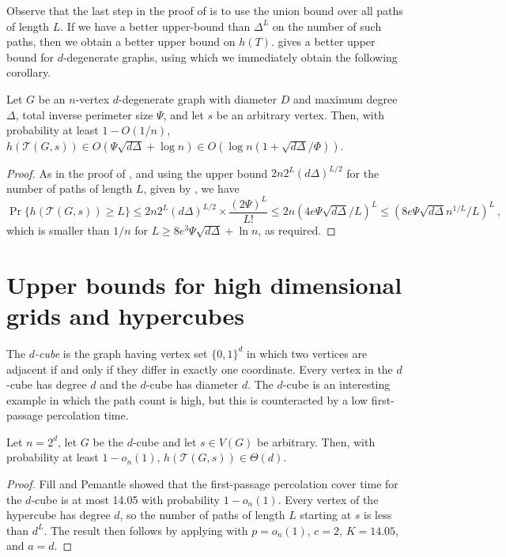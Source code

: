 \documentclass{patmorin}
\newcommand{\tcal}{\mathcal{T}}
\begin{document}
Observe that the last step in the proof of
 is to use the union bound over all
paths of length $L$.  If we have a better upper-bound than $\Delta^L$ on
the number of such paths, then we obtain a better upper bound on $h(T)$.
 gives a better upper bound for $d$-degenerate graphs, using which we immediately obtain the following corollary.

\begin{cor}
  Let $G$ be an $n$-vertex $d$-degenerate graph with diameter $D$
  and maximum degree $\Delta$, total inverse perimeter size $\Psi$,
  and let $s$ be an arbitrary vertex.
  Then, with probability at least $1-O(1/n)$,
  $h(\tcal(G,s))\in O(\Psi\sqrt{d\Delta}+\log n)
  \in O(\log n (1+ \sqrt{d\Delta}/\Phi))$.
\end{cor}

\begin{proof}
As in the proof of ,
and using the upper bound 
$2n2^{L}(d\Delta)^{L/2}$ for the number of paths of length $L$, given by , we have
   \[
        \Pr\{h(\tcal(G,s)) \ge L\} \le  2n2^{L}(d\Delta)^{L/2}\times
        \frac{(2\Psi)^L}{L!} \leq
        2n\left( 4e\Psi\sqrt{d\Delta}/L \right)^L
        \leq
        \left( 8e\Psi\sqrt{d\Delta}n^{1/L}/L \right)^L\:,
    \]
    which is smaller than $1/n$ for $L\geq 8e^3 \Psi \sqrt{d\Delta}+\ln n$, as required.
\end{proof}

\section{Upper bounds for high dimensional grids and hypercubes}
The \emph{$d$-cube} is the graph having vertex set $\{0,1\}^d$ in
which two vertices are adjacent if and only if they differ in exactly
one coordinate.  Every vertex in the $d$-cube has degree $d$ and the
$d$-cube has diameter $d$.  The $d$-cube is an interesting example
in which the path count is high, but this is counteracted by a low
first-passage percolation time.

\begin{thm}
  Let $n=2^d$, let $G$ be the $d$-cube and let $s\in V(G)$ be arbitrary. Then,
  with probability at least $1-o_n(1)$, $h(\tcal(G,s))\in \Theta(d)$.
\end{thm}

\begin{proof}
  Fill and Pemantle \cite{fill.pemantle:percolation} showed that the
  first-passage percolation cover time for the $d$-cube is at most 14.05
  with probability $1-o_n(1)$.  Every vertex of the hypercube has degree
  $d$, so the number of paths of length $L$ starting at $s$ is less
  than $d^L$.  The result then follows by applying 
  with $p=o_n(1)$, $c=2$, $K=14.05$, and $a=d$.
\end{proof}
\end{document}
